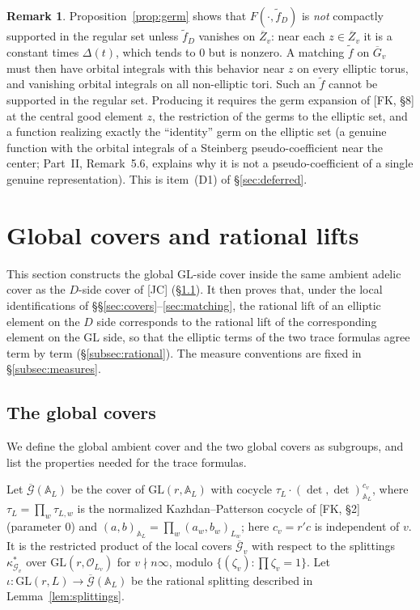 \documentclass[12pt]{article}
\newcommand{\ov}[1]{\overline{#1}}
\newcommand{\A}{\mathbb{A}}
\newcommand{\cO}{\mathcal{O}}
\newcommand{\GL}{\mathrm{GL}}
\newcommand{\Gb}{\ov{G}}
\newcommand{\Zb}{\ov{Z}}
\newcommand{\ks}{\kappa^{*}}
\newcommand{\cG}{\mathcal{G}}
\newcommand{\cGb}{\ov{\mathcal{G}}}
\theoremstyle{plain}
\theoremstyle{definition}
\newtheorem{remark}[theorem]{Remark}
\begin{document}
\begin{remark}
Proposition~\ref{prop:germ} shows that $F(\cdot,\tilde f_D)$ is \emph{not} compactly supported in the regular set unless $\tilde f_D$ vanishes on $\Zb_v$: near each $z\in\Zb_v$ it is a constant times $\Delta(t)$, which tends to $0$ but is nonzero. A matching $\tilde f$ on $\Gb_v$ must then have orbital integrals with this behavior near $z$ on every elliptic torus, and vanishing orbital integrals on all non-elliptic tori. Such an $\tilde f$ cannot be supported in the regular set. Producing it requires the germ expansion of [FK, \S8] at the central good element $z$, the restriction of the germs to the elliptic set, and a function realizing exactly the ``identity'' germ on the elliptic set (a genuine function with the orbital integrals of a Steinberg pseudo-coefficient near the center; Part~II, Remark~5.6, explains why it is not a pseudo-coefficient of a single genuine representation). This is item~(D1) of \S\ref{sec:deferred}.
\end{remark}


\section{Global covers and rational lifts}\label{sec:global}
This section constructs the global $\GL$-side cover inside the same ambient adelic cover as the $D$-side cover of [JC] (\S\ref{subsec:globalcovers}). It then proves that, under the local identifications of \S\S\ref{sec:covers}--\ref{sec:matching}, the rational lift of an elliptic element on the $D$ side corresponds to the rational lift of the corresponding element on the $\GL$ side, so that the elliptic terms of the two trace formulas agree term by term (\S\ref{subsec:rational}). The measure conventions are fixed in \S\ref{subsec:measures}.

\subsection{The global covers}\label{subsec:globalcovers}
We define the global ambient cover and the two global covers as subgroups, and list the properties needed for the trace formulas.

Let $\cGb(\A_L)$ be the cover of $\GL(r,\A_L)$ with cocycle $\tau_L\cdot(\det,\det)_{\A_L}^{c_v}$, where $\tau_L=\prod_w\tau_{L,w}$ is the normalized Kazhdan--Patterson cocycle of [FK, \S2] (parameter $0$) and $(a,b)_{\A_L}=\prod_w(a_w,b_w)_{L_w}$; here $c_v=r'c$ is independent of $v$. It is the restricted product of the local covers $\cGb_v$ with respect to the splittings $\ks_{\cG_v}$ over $\GL(r,\cO_{L_v})$ for $v\nmid n\infty$, modulo $\{(\zeta_v):\prod\zeta_v=1\}$. Let $\iota:\GL(r,L)\to\cGb(\A_L)$ be the rational splitting described in Lemma~\ref{lem:splittings}.
\end{document}
